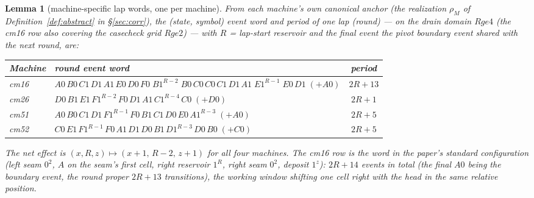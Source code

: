 \documentclass[11pt]{amsart}
\newtheorem{lemma}[theorem]{Lemma}
\begin{document}
\begin{lemma}[machine-specific lap words, one per machine]\label{lem:lap}
From \emph{each machine's own canonical anchor} (the realization $\rho_M$ of Definition~\ref{def:abstract} in \S\ref{sec:corr}), the (state, symbol) event word and period of one lap (round) --- on the drain domain $Rge4$ (the cm16 row also covering the casecheck grid $Rge2$) --- with $R$ = lap-start reservoir and the final event the pivot boundary event shared with the next round, are:
\begin{center}\small
\begin{tabular}{llc}
\toprule
Machine & round event word & period\\
\midrule
cm16 & $A0\,B0\,C1\,D1\,A1\,E0\,D0\,F0\;B1^{R-2}\;B0\,C0\,C0\,C1\,D1\,A1\;E1^{R-1}\;E0\,D1\;({+}A0)$ & $2R{+}13$\\
cm26 & $D0\,B1\,E1\,F1^{R-2}\,F0\,D1\,A1\,C1^{R-4}\,C0\;({+}D0)$ & $2R{+}1$\\
cm51 & $A0\,B0\,C1\,D1\,F1^{R-1}\,F0\,B1\,C1\,D0\,E0\,A1^{R-3}\;({+}A0)$ & $2R{+}5$\\
cm52 & $C0\,E1\,F1^{R-1}\,F0\,A1\,D1\,D0\,B1\,D1^{R-3}\,D0\,B0\;({+}C0)$ & $2R{+}5$\\
\bottomrule
\end{tabular}
\end{center}
The net effect is $(x,R,z)\mapsto(x{+}1,\,R{-}2,\,z{+}1)$ for all four machines. The cm16 row is the word in the paper's standard configuration (left seam $0^2$, $A$ on the seam's first cell, right reservoir $1^R$, right seam $0^2$, deposit $1^z$): $2R{+}14$ events in total (the final $A0$ being the boundary event, the round proper $2R{+}13$ transitions), the working window shifting one cell right with the head in the same relative position.
\end{lemma}
\end{document}

